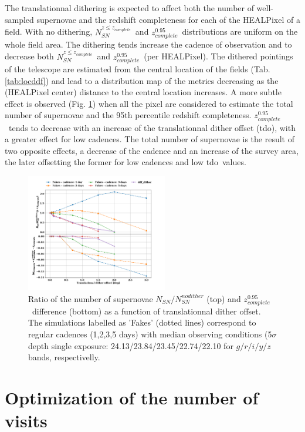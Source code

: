 \documentclass[skiphelvet,twocolumn]{aastex63}
\newcommand{\nsncomp}{{$N_{SN}^{z\leq z_{complete}}$}}
\newcommand{\zcompb}{\mbox{$z_{complete}^{0.95}$}}
\newcommand{\doffset}{tdo}
\begin{document}
\par
The translationnal dithering is expected to affect both the number of well-sampled supernovae and the redshift completeness for each of the HEALPixel of a field. With no dithering, \nsncomp~and \zcompb~distributions are uniform on the whole field area. The dithering tends increase the cadence of observation and to decrease both \nsncomp~and \zcompb~(per HEALPixel). The dithered pointings of the telescope are estimated from the central location of the fields (Tab. \ref{tab:locddf}) and lead to a distribution map of the metrics decreasing as the (HEALPixel center) distance to the central location increases. A more subtle effect is observed (Fig. \ref{fig:dither}) when all the pixel are considered to estimate the total number of supernovae and the 95th percentile redshift completeness. \zcompb~tends to decrease with an increase of the translationnal dither offset (\doffset), with a greater effect for low cadences. The total number of supernovae is the result of two opposite effects, a decrease of the cadence and an increase of the survey area, the later offsetting the former for low cadences and low \doffset~values.

\begin{figure}[htbp]
  \begin{center}
  \includegraphics[width=0.55\textwidth]{dither_ddf.png}
 \caption{Ratio of the number of supernovae $N_{SN}/N_{SN}^{nodither}$ (top) and \zcompb~difference (bottom) as a function of translationnal dither offset. The simulations labelled as 'Fakes' (dotted lines) correspond to regular cadences (1,2,3,5 days) with median observing conditions (5$\sigma$ depth single exposure: 24.13/23.84/23.45/22.74/22.10 for $g/r/i/y/z$ bands, respectivelly.}\label{fig:dither}
\end{center}
\end{figure}



\section{Optimization of the number of visits}
\label{sec:opti}
\end{document}
